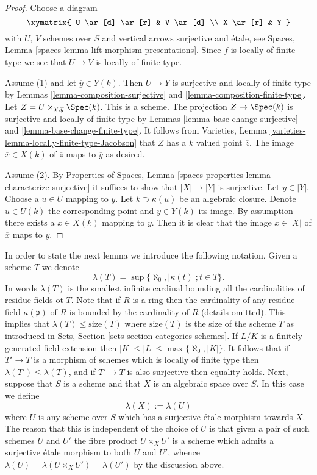 \begin{proof}
Choose a diagram
$$
\xymatrix{
U \ar[d] \ar[r] & V \ar[d] \\
X \ar[r] & Y
}
$$
with $U$, $V$ schemes over $S$ and vertical arrows surjective
and \'etale, see
Spaces, Lemma \ref{spaces-lemma-lift-morphism-presentations}.
Since $f$ is locally of finite type we see that $U \to V$ is locally of
finite type.

\medskip\noindent
Assume (1) and let $\overline{y} \in Y(k)$. Then $U \to Y$ is
surjective and locally of finite type by
Lemmas \ref{lemma-composition-surjective} and
\ref{lemma-composition-finite-type}.
Let $Z = U \times_{Y, \overline{y}} \Spec(k)$. This is a scheme.
The projection $Z \to \Spec(k)$
is surjective and locally of finite type by
Lemmas \ref{lemma-base-change-surjective} and
\ref{lemma-base-change-finite-type}.
It follows from
Varieties, Lemma \ref{varieties-lemma-locally-finite-type-Jacobson}
that $Z$ has a $k$ valued point $\overline{z}$. The image
$\overline{x} \in X(k)$ of $\overline{z}$ maps to $\overline{y}$
as desired.

\medskip\noindent
Assume (2). By
Properties of Spaces,
Lemma \ref{spaces-properties-lemma-characterize-surjective}
it suffices to show that $|X| \to |Y|$ is surjective.
Let $y \in |Y|$. Choose a $u \in U$ mapping to $y$.
Let $k \supset \kappa(u)$ be an algebraic closure. Denote
$\overline{u} \in U(k)$ the corresponding point and
$\overline{y} \in Y(k)$ its image. By assumption there exists
a $\overline{x} \in X(k)$ mapping to $\overline{y}$.
Then it is clear that the image $x \in |X|$ of $\overline{x}$
maps to $y$.
\end{proof}

\noindent
In order to state the next lemma we introduce the following
notation. Given a scheme $T$ we denote
$$
\lambda(T) = \sup\{\aleph_0, |\kappa(t)| ; t \in T\}.
$$
In words $\lambda(T)$ is the smallest infinite cardinal bounding
all the cardinalities of residue fields ot $T$. Note that if $R$
is a ring then the cardinality of any residue field $\kappa(\mathfrak p)$
of $R$ is bounded by the cardinality of $R$ (details omitted).
This implies that $\lambda(T) \leq \text{size}(T)$ where
$\text{size}(T)$ is the size of the scheme $T$ as introduced in
Sets, Section \ref{sets-section-categories-schemes}.
If $L/K$ is a finitely generated field extension then
$|K| \leq |L| \leq \max\{\aleph_0, |K|\}$. It follows that if $T' \to T$
is a morphism of schemes which is locally of finite
type then $\lambda(T') \leq \lambda(T)$, and if $T' \to T$ is also
surjective then equality holds. Next, suppose that $S$ is a scheme
and that $X$ is an algebraic space over $S$. In this case we define
$$
\lambda(X) := \lambda(U)
$$
where $U$ is any scheme over $S$ which has a surjective \'etale morphism
towards $X$. The reason that this is independent of the choice of $U$
is that given a pair of such schemes $U$ and $U'$ the fibre product
$U \times_X U'$ is a scheme which admits a surjective \'etale morphism
to both $U$ and $U'$, whence $\lambda(U) = \lambda(U \times_X U') =
\lambda(U')$ by the discussion above.

